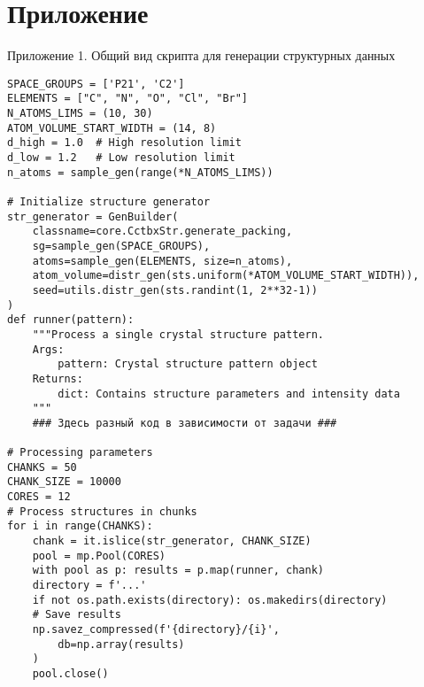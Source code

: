\section*{Приложение}
\begin{center}
Приложение 1. Общий вид скрипта для генерации структурных данных
\end{center}
\begin{verbatim}
SPACE_GROUPS = ['P21', 'C2']       
ELEMENTS = ["C", "N", "O", "Cl", "Br"]
N_ATOMS_LIMS = (10, 30)
ATOM_VOLUME_START_WIDTH = (14, 8)
d_high = 1.0  # High resolution limit
d_low = 1.2   # Low resolution limit
n_atoms = sample_gen(range(*N_ATOMS_LIMS))

# Initialize structure generator
str_generator = GenBuilder(
    classname=core.CctbxStr.generate_packing,
    sg=sample_gen(SPACE_GROUPS),
    atoms=sample_gen(ELEMENTS, size=n_atoms),
    atom_volume=distr_gen(sts.uniform(*ATOM_VOLUME_START_WIDTH)),
    seed=utils.distr_gen(sts.randint(1, 2**32-1))
)
def runner(pattern):
    """Process a single crystal structure pattern.
    Args:
        pattern: Crystal structure pattern object
    Returns:
        dict: Contains structure parameters and intensity data
    """
    ### Здесь разный код в зависимости от задачи ###
    
# Processing parameters
CHANKS = 50
CHANK_SIZE = 10000
CORES = 12
# Process structures in chunks
for i in range(CHANKS):
    chank = it.islice(str_generator, CHANK_SIZE)
    pool = mp.Pool(CORES)   
    with pool as p: results = p.map(runner, chank)
    directory = f'...'
    if not os.path.exists(directory): os.makedirs(directory)
    # Save results
    np.savez_compressed(f'{directory}/{i}',
        db=np.array(results)
    )
    pool.close()        
\end{verbatim}
\newpage

